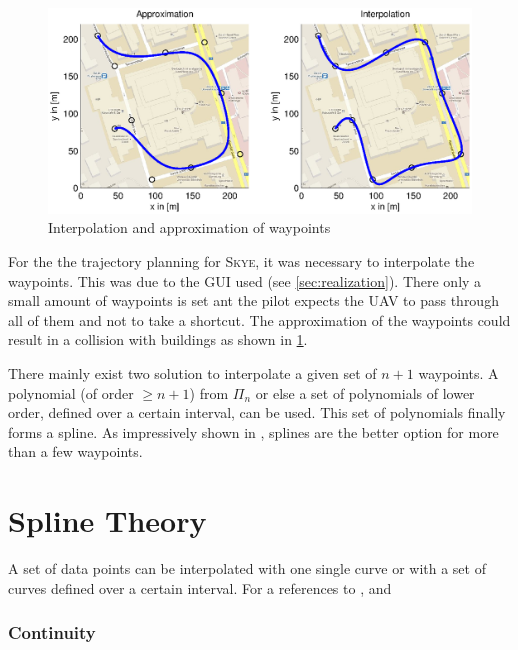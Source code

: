 \begin{figure}[H]
  \begin{minipage}[t]{0.9\textwidth}
    \includegraphics[width = \textwidth]{graphics/ApproxInterpol.eps}
  \end{minipage}
  \hfill
  \begin{minipage}[t]{0.8\textwidth}
  \end{minipage}
  \caption{Interpolation and approximation of waypoints}
  \label{fig:ApproxInterpol}
\end{figure}

For the the trajectory planning for \textsc{Skye}, it was necessary to interpolate the waypoints. This was due to the GUI used (see \ref{sec:realization}). There only a small amount of waypoints is set ant the pilot expects the UAV to pass through all of them and not to take a shortcut. The approximation of the waypoints could result in a collision with buildings as shown in \ref{fig:ApproxInterpol}.


There mainly exist two solution to interpolate a given set of $n+1$ waypoints. A polynomial (of order $\ge n+1$) from $\varPi_{n}$ or else a set of polynomials of lower order, defined over a certain interval, can be used. This set of polynomials finally forms a spline. As impressively shown in \cite{wolfgang}, splines are the better option for more than a few waypoints. 

\section{Spline Theory}
A set of data points can be interpolated with one single curve or with a set of curves defined over a certain interval.  For a 
\label{sec:splineTheory}
references to \cite{engeln}, \cite{biagiotti} and \cite{doessegger}
\subsubsection{Continuity}
